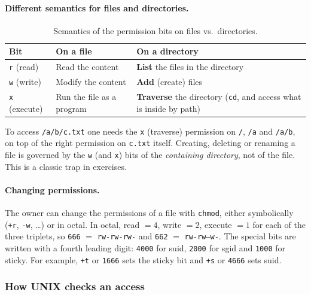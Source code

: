 \paragraph{Different semantics for files and directories.}

\begin{table}[h]
\centering
\begin{tabular}{@{}lp{5.2cm}p{5.2cm}@{}}
\toprule
\textbf{Bit} & \textbf{On a file} & \textbf{On a directory} \\
\midrule
\texttt{r} (read) & Read the content & \textbf{List} the files in the directory \\
\texttt{w} (write) & Modify the content & \textbf{Add} (create) files \\
\texttt{x} (execute) & Run the file as a program & \textbf{Traverse} the directory (\texttt{cd}, and access what is inside by path) \\
\bottomrule
\end{tabular}
\caption{Semantics of the permission bits on files vs.\ directories.}
\end{table}

\begin{remark}
To access \texttt{/a/b/c.txt} one needs the \texttt{x} (traverse) permission on \texttt{/}, \texttt{/a} and \texttt{/a/b}, on top of the right permission on \texttt{c.txt} itself. Creating, deleting or renaming a file is governed by the \texttt{w} (and \texttt{x}) bits of the \emph{containing directory}, not of the file. This is a classic trap in exercises.
\end{remark}

\paragraph{Changing permissions.} The owner can change the permissions of a file with \texttt{chmod}, either symbolically (\texttt{+r}, \texttt{-w}, \dots) or in octal. In octal, read $=4$, write $=2$, execute $=1$ for each of the three triplets, so \texttt{666} $=$ \texttt{rw-rw-rw-} and \texttt{662} $=$ \texttt{rw-rw--w-}. The special bits are written with a fourth leading digit: \texttt{4000} for suid, \texttt{2000} for sgid and \texttt{1000} for sticky. For example, \texttt{+t} or \texttt{1666} sets the sticky bit and \texttt{+s} or \texttt{4666} sets suid.

\subsubsection{How UNIX checks an access}

